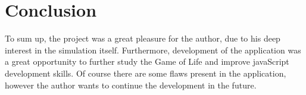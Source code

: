 \documentclass[11pt,a4paper]{article}
\begin{document}
\section{Conclusion}
To sum up, the project was a great pleasure for the author, due to his deep interest in the simulation itself. Furthermore, development of the application was a great opportunity to further study the Game of Life and improve javaScript development skills. Of course there are some flaws present in the application, however the author wants to continue the development in the future.
\end{document}
